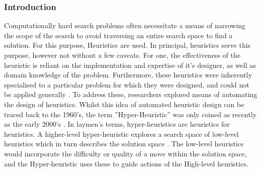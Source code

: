 \documentclass[a4paper,12pt]{article}
\begin{document}
        \subsubsection{Introduction}
            \par{
                \noindent
                Computationally hard search problems often necessitate a means of narrowing
                the scope of the search to avoid traversing an entire search space to find a solution. 
                For this purpose, Heuristics are used. In principal, heuristics serve this
                purpose, however not without a few caveats. For one, the effectiveness of the
                heuristic is reliant on the implementation and expertise of it’s designer, as well
                as domain knowledge of the problem. Furthermore, these heuristics were inherently 
                specialised to a particular problem for which they were designed, and
                could not be applied generally \cite{hyperheuristictas}. To address these, researchers explored
                means of automating the design of heuristics. Whilst this idea of automated
                heuristic design can be traced back to the 1960’s, the term ”Hyper-Heuristic”
                was only coined as recently as the early 2000’s \cite{hyperheuristic2000}. In laymen’s terms,
                hyper-heuristics are heuristics for heuristics. A higher-level hyper-heuristic explores a search space 
                of low-level heuristics which in turn describes the solution space \cite{hhcds}. The low-level 
                heuristics would incorporate the difficulty or quality of a move within the solution space, and 
                the Hyper-heuristic uses these to guide actions of the High-level heuristics.
            }
\end{document}
